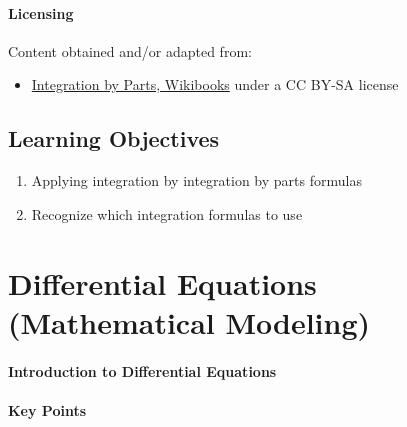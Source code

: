 \paragraph{Licensing}

Content obtained and/or adapted from:
\begin{itemize}
    \item \href{https://en.wikibooks.org/wiki/Calculus/Integration_techniques/Integration_by_Parts}{Integration by Parts, Wikibooks} under a CC BY-SA license
\end{itemize}

\subsection{Learning Objectives}

\begin{enumerate}
    \item Applying integration by integration by parts formulas
    \item Recognize which integration formulas to use
\end{enumerate}

\section{Differential Equations (Mathematical Modeling)}
\label{sec:differential-equations-mathematical-modeling}

\paragraph{Introduction to Differential Equations}

\paragraph{Key Points}

